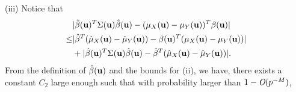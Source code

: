 \documentclass[11pt]{article}
\theoremstyle{definition}
\begin{document}
 (iii) Notice that
 \begin{align}\label{iii1}
 	&|\hat{\beta}({\bf u})^T\Sigma({\bf u})\hat{\beta}({\bf u}) - (\mu_X({\bf u})-\mu_Y({\bf u}))^T\beta({\bf u}) |   \\
 	\leq& |\hat{\beta}^T(\hat{\mu}_X({\bf u})-\hat{\mu}_Y({\bf u})) -\beta({\bf u})^T(\mu_X({\bf u})-\mu_Y({\bf u})) |     \nonumber \\
 	&+ |\hat{\beta}({\bf u})^T\Sigma({\bf u})\hat{\beta}({\bf u}) -\hat{\beta}^T(\hat{\mu}_X({\bf u})-\hat{\mu}_Y({\bf u})) | .\nonumber
 \end{align}
 From the definition of $\hat{\beta}({\bf u})$ and the bounds for (ii),
 we have, there exists a constant $C_2$ large enough such that with probability larger than $1-\emph{O}(p^{-M})$,
\end{document}
